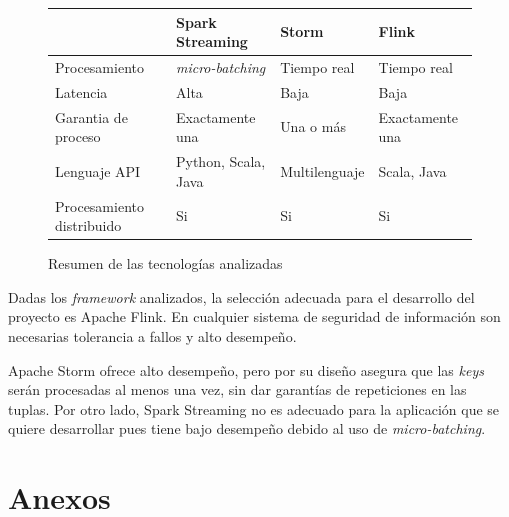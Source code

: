 \documentclass[a4paper,10pt, oneside]{article}
\begin{document}
\begin{figure}[htpb]
	\centering
	\begin{tabular}{|l|l|l|l|}
		\hline
		& Spark Streaming & Storm & Flink \\
		\hline
		Procesamiento & \textit{micro-batching} & Tiempo real & Tiempo real \\
		Latencia & Alta & Baja & Baja \\
		Garantia de proceso & Exactamente una & Una o más & Exactamente una \\
		Lenguaje API & Python, Scala, Java & Multilenguaje & Scala, Java \\
		Procesamiento distribuido & Si & Si & Si \\
		\hline
	\end{tabular}
	\caption*{Resumen de las tecnologías analizadas}
\end{figure}

Dadas los \textit{framework} analizados, la selección adecuada para el desarrollo del proyecto es Apache Flink. En cualquier sistema de seguridad de información son necesarias tolerancia a fallos y alto desempeño.\par
Apache Storm ofrece alto desempeño, pero por su diseño asegura que las \textit{keys} serán procesadas al menos una vez, sin dar garantías de repeticiones en las tuplas. Por otro lado, Spark Streaming no es adecuado para la aplicación que se quiere desarrollar pues tiene bajo desempeño debido al uso de \textit{micro-batching}.

\newpage
\section*{Anexos}
\end{document}
